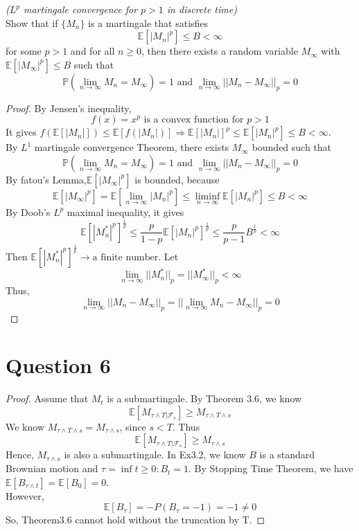 \documentclass{article}
\begin{document}
    \textit{($L^p$ martingale convergence for $p>1$ in discrete time)}\\
    Show that if $\{M_n\}$ is a martingale that satisfies
    $$\mathbb{E}\left[\left|M_n\right|^p\right] \leqslant B < \infty$$
    for some $p>1$ and for all $n\geqslant 0$, then there exists a random variable $M_\infty$ with $\mathbb{E}\left[\left| M_\infty\right|^p\right]\leqslant B$ such that
    $$\mathbb{P}\left(\lim_{n\to \infty}M_n = M_\infty\right)=1 \text{ and } \lim_{n\to \infty}||M_n-M_\infty||_p=0$$
    \begin{proof}
    By Jensen's inequality,
    $$f(x)=x^p \text{ is a convex function for } p>1$$
    It gives $f(\mathbb{E}[|M_n|])\leqslant \mathbb{E}[f(|M_n|)] \Rightarrow \mathbb{E}[|M_n|]^p \leqslant \mathbb{E}[|M_n|^p]\leqslant B <\infty$.\\
    By $L^1$ martingale convergence Theorem, there exists $M_\infty$ bounded such that
    $$\mathbb{P}\left(\lim_{n\to \infty}M_n = M_\infty\right)=1 \text{ and } \lim_{n\to \infty}||M_n-M_\infty||_p=0$$
    By fatou's Lemma,$\mathbb{E}[|M_\infty|^p]$ is bounded, because
    $$\mathbb{E}[|M_\infty|^p]=\mathbb{E}[\lim_{n\to\infty}|M_n|^p]\leqslant \liminf_{n\to \infty}\mathbb{E}[|M_n|^p]\leqslant B<\infty$$
    By Doob's $L^p$ maximal inequality, it gives
    $$\mathbb{E}[|M_n^*|^p]^{\frac{1}{p}}\leqslant \frac{p}{1-p}\mathbb{E}[|M_n|^p]^{\frac{1}{p}}\leqslant\frac{p}{p-1}B^{\frac{1}{p}}<\infty$$
    Then $\mathbb{E}[|M_n^*|^p]^{\frac{1}{p}} \to \text{a finite number}$.
    Let $$\lim_{n\to \infty}||M_n^*||_p =||M_\infty^*||_p<\infty$$
    Thus,
    $$\lim_{n\to\infty} ||M_n-M_\infty||_p=||\lim_{n\to\infty}M_n - M_\infty||_p=0$$
    \end{proof}

\section*{Question 6}
    \begin{proof}
    Assume that $M_t$ is a submartingale.
    By Theorem 3.6, we know
    $$\mathbb{E}[M_{\tau \wedge T|\mathcal{F}_s}]\geqslant M_{\tau\wedge T \wedge s}$$
    We know $M_{\tau\wedge T \wedge s}=M_{\tau \wedge s}$, since $s<T$. Thus
    $$\mathbb{E}[M_{\tau \wedge T|\mathcal{F}_s}]\geqslant M_{\tau \wedge s}$$
    Hence, $M_{\tau \wedge s}$ is also a submartingale. In Ex3.2, we know $B$ is a standard Brownian motion and $\tau=\inf{t\geqslant 0: B_t=1}$. By Stopping Time Theorem, we have $\mathbb{E}[B_{\tau\wedge t}]=\mathbb{E}[B_0]=0$.\\
    However,
    $$\mathbb{E}[B_\tau]=-P(B_\tau=-1)=-1 \not=0$$
    So, Theorem3.6 cannot hold without the truncation by T.
    \end{proof}
\end{document}
